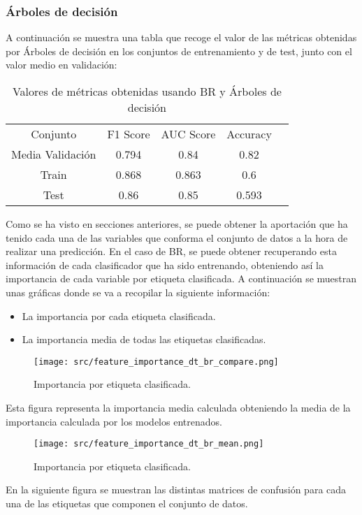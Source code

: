 \subsubsection*{Árboles de decisión}
A continuación se muestra una tabla que recoge el valor de las métricas obtenidas por Árboles de decisión en los conjuntos de entrenamiento y de test, junto con el valor medio en validación:
\begin{table}[H]
	\centering
	\begin{tabular}{|c|c|c|c|c}
		\cline{1-4}
		Conjunto         & F1 Score & AUC Score & Accuracy \\ \cline{1-4}
		Media Validación & 0.794    & 0.84      & 0.82     \\ \cline{1-4}
		Train            & 0.868    & 0.863     & 0.6      \\ \cline{1-4}
		Test             & 0.86     & 0.85      & 0.593    \\ \cline{1-4}
	\end{tabular}
	\caption{Valores de métricas obtenidas usando BR y Árboles de decisión}
\end{table}
Como se ha visto en secciones anteriores, se puede obtener la aportación que ha tenido cada una de las variables que conforma el conjunto de datos a la hora de realizar una predicción. En el caso de BR, se puede obtener recuperando esta información de cada clasificador que ha sido entrenando, obteniendo así la importancia de cada variable por etiqueta clasificada.
A continuación se muestran unas gráficas donde se va a recopilar la siguiente información:
\begin{itemize}
	\item La importancia por cada etiqueta clasificada.
	\item La importancia media de todas las etiquetas clasificadas.
\end{itemize}
\begin{figure}[H]
	\centering
	\texttt{[image: src/feature\_importance\_dt\_br\_compare.png]}
	\caption{Importancia por etiqueta clasificada.}
	\label{fig:dt_br_label}
\end{figure}
Esta figura representa la importancia media calculada obteniendo la media de la importancia calculada por los modelos entrenados.
\begin{figure}[H]
	\centering
	\texttt{[image: src/feature\_importance\_dt\_br\_mean.png]}
	\caption{Importancia por etiqueta clasificada.}
	\label{fig:dt_br_mean}
\end{figure}
En la siguiente figura se muestran las distintas matrices de confusión para cada una de las etiquetas que componen el conjunto de datos.
